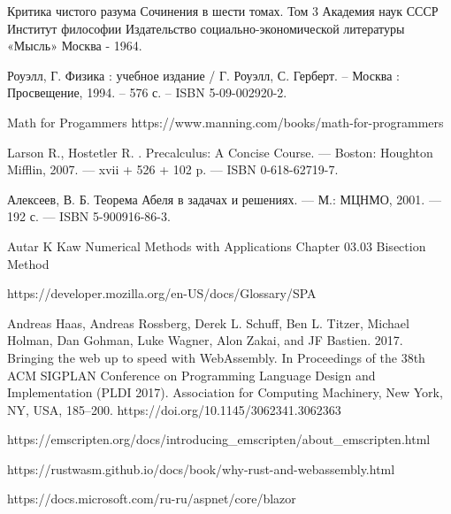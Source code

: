 \begingroup
\renewcommand{\section}[2]{\Anonchapter{Список использованных источников}\vspace{-1em}}
\begin{thebibliography}{00}

    Критика чистого разума
    Сочинения в шести томах.
    Том 3
    Академия наук СССР
    Институт философии
    Издательство социально-экономической литературы
    «Мысль»
    Москва - 1964. \TODO

    Роуэлл, Г. Физика : учебное издание / Г. Роуэлл, С. Герберт. -- Москва : Просвещение, 1994. -- 576 с. -- ISBN 5-09-002920-2.

    Math for Progammers \TODO
    https://www.manning.com/books/math-for-programmers

    Larson R., Hostetler R. . Precalculus: A Concise Course. — Boston:
    Houghton Mifflin, 2007. — xvii + 526 + 102 p. — ISBN 0-618-62719-7. \TODO

    Алексеев, В. Б. Теорема Абеля в задачах и решениях. — М.: МЦНМО, 2001. — 192 с. — ISBN 5-900916-86-3. \TODO

    \TODO Autar K Kaw Numerical Methods with Applications Chapter 03.03 Bisection Method

    https://developer.mozilla.org/en-US/docs/Glossary/SPA \TODO

    Andreas Haas, Andreas Rossberg, Derek L. Schuff, Ben L. Titzer, Michael Holman, Dan Gohman, Luke Wagner, Alon Zakai, and JF Bastien.
    2017. Bringing the web up to speed with WebAssembly.
    In Proceedings of the 38th ACM SIGPLAN Conference on Programming Language Design and Implementation (PLDI 2017).
    Association for Computing Machinery, New York, NY, USA, 185–200. https://doi.org/10.1145/3062341.3062363 \TODO

    https://emscripten.org/docs/introducing\_emscripten/about\_emscripten.html \TODO

    https://rustwasm.github.io/docs/book/why-rust-and-webassembly.html \TODO

    https://docs.microsoft.com/ru-ru/aspnet/core/blazor \TODO


\end{thebibliography}
